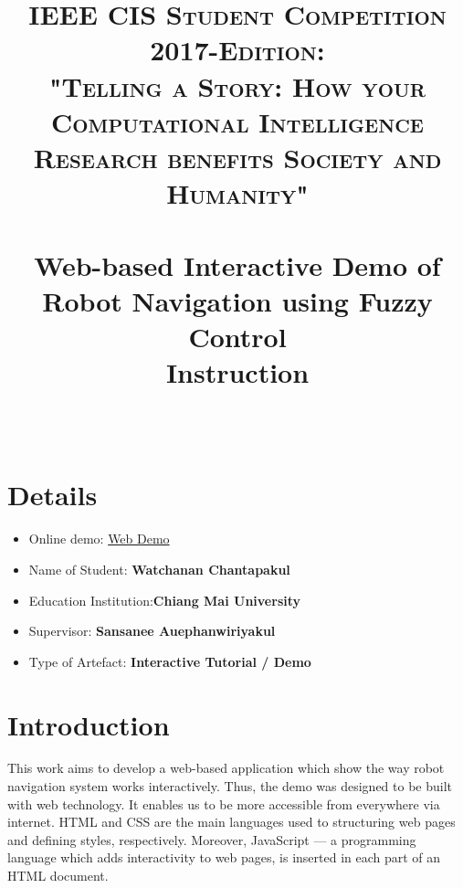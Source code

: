\documentclass[paper=a4, fontsize=11pt]{scrartcl}
\title{
	\usefont{OT1}{bch}{b}{n}
	\normalfont \normalsize \textsc{IEEE CIS Student Competition 2017-Edition: \\ "Telling a Story: How your Computational Intelligence Research benefits Society and Humanity"} \\ [25pt]
	\horrule{0.5pt} \\[0.4cm]
	\huge Web-based Interactive Demo of Robot Navigation using Fuzzy Control 
	\\\textbf{Instruction}
	\\
	\horrule{2pt} \\[0cm]
}
\date{}
\numberwithin{equation}{section}		%
\numberwithin{figure}{section}			%
\numberwithin{table}{section}				%
\begin{document}
	\maketitle
	
	\section{Details}
	
	\begin{itemize}
		\item Online demo: \href{https://tmwatchanan.github.io/fuzzy-robot-navigation/index.html}{Web Demo}
		\item Name of Student: \textbf{Watchanan Chantapakul}
		\item Education Institution:\textbf{Chiang Mai University}
		\item Supervisor: \textbf{Sansanee Auephanwiriyakul}
		\item Type of Artefact: \textbf{Interactive Tutorial / Demo}
	\end{itemize}
	
	
	
	\section{Introduction}
	This work aims to develop a web-based application which show the way robot navigation system works interactively. Thus, the demo was designed to be built with web technology. It enables us to be more accessible from everywhere via internet. HTML and CSS are the main languages used to structuring web pages and defining styles, respectively. Moreover, JavaScript --- a programming language which adds interactivity to web pages, is inserted in each part of an HTML document.
	
\end{document}
